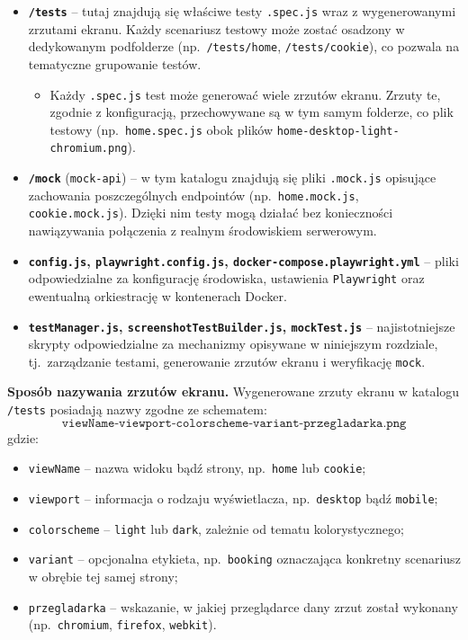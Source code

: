 \documentclass[12pt]{report}
\begin{document}
\begin{itemize}
    \item \textbf{\texttt{/tests}} -- tutaj znajdują się właściwe testy \texttt{.spec.js} wraz z wygenerowanymi zrzutami ekranu. Każdy scenariusz testowy może zostać osadzony w dedykowanym podfolderze (np.~\texttt{/tests/home}, \texttt{/tests/cookie}), co pozwala na tematyczne grupowanie testów.
    \begin{itemize}
        \item Każdy \texttt{.spec.js} test może generować wiele zrzutów ekranu. Zrzuty te, zgodnie z konfiguracją, przechowywane są w tym samym folderze, co plik testowy (np.~\texttt{home.spec.js} obok plików \texttt{home-desktop-light-chromium.png}).
    \end{itemize}
    \item \textbf{\texttt{/mock}} (\texttt{mock-api}) -- w tym katalogu znajdują się pliki \texttt{.mock.js} opisujące zachowania poszczególnych endpointów (np.~\texttt{home.mock.js}, \texttt{cookie.mock.js}). Dzięki nim testy mogą działać bez konieczności nawiązywania połączenia z realnym środowiskiem serwerowym.
    \item \textbf{\texttt{config.js}, \texttt{playwright.config.js}, \texttt{docker-compose.playwright.yml}} -- pliki odpowiedzialne za konfigurację środowiska, ustawienia \texttt{Playwright} oraz ewentualną orkiestrację w kontenerach Docker.
    \item \textbf{\texttt{testManager.js}, \texttt{screenshotTestBuilder.js}, \texttt{mockTest.js}} -- najistotniejsze skrypty odpowiedzialne za mechanizmy opisywane w niniejszym rozdziale, tj.~zarządzanie testami, generowanie zrzutów ekranu i weryfikację \texttt{mock}.
\end{itemize}

\noindent \textbf{Sposób nazywania zrzutów ekranu.}  
Wygenerowane zrzuty ekranu w katalogu \texttt{/tests} posiadają nazwy zgodne ze schematem:
\[
    \texttt{viewName-viewport-colorscheme-variant-przegladarka.png}
\]
gdzie:
\begin{itemize}
    \item \texttt{viewName} -- nazwa widoku bądź strony, np.~\texttt{home} lub \texttt{cookie};
    \item \texttt{viewport} -- informacja o rodzaju wyświetlacza, np.~\texttt{desktop} bądź \texttt{mobile};
    \item \texttt{colorscheme} -- \texttt{light} lub \texttt{dark}, zależnie od tematu kolorystycznego;
    \item \texttt{variant} -- opcjonalna etykieta, np.~\texttt{booking} oznaczająca konkretny scenariusz w obrębie tej samej strony;
    \item \texttt{przegladarka} -- wskazanie, w jakiej przeglądarce dany zrzut został wykonany (np.~\texttt{chromium}, \texttt{firefox}, \texttt{webkit}).
\end{itemize}
\end{document}

